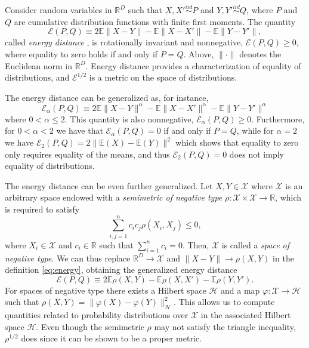 \documentclass[aps,preprint,nofootinbib,floatfix]{revtex4-1}
\newcommand\Energy{\mathcal{E}}
\newcommand\E{\mathbb{E}}
\begin{document}
Consider random variables in $\mathbb{R}^D$ 
such that $X,X' \stackrel{iid}{\sim} P$ and 
$Y,Y' \stackrel{iid}{\sim} Q$, where $P$ and $Q$ are cumulative
distribution functions with finite first moments. 
The quantity 
\begin{equation}
\label{eq:energy}
\Energy(P, Q) \equiv 2 \E \| X - Y\| - \E \| X - X' \| - \E \| Y - Y' \|,
\end{equation}
called \emph{energy distance} \cite{Szkely2013}, 
is rotationally invariant and nonnegative, $\Energy(P,Q) \ge 0$, where
equality
to zero holds if and only if $P = Q$.
Above, $\| \cdot \|$ denotes the
Euclidean norm in $\mathbb{R}^D$. 
Energy distance
provides a characterization of equality of distributions, and
$\Energy^{1/2}$ is
a metric on the space of distributions.

The energy distance can be generalized as, for instance,
\begin{equation}
\label{eq:energy2}
\Energy_\alpha(P, Q) \equiv 
2 \E \| X - Y\|^{\alpha} - \E \| X - X' \|^{\alpha} - 
\E \| Y - Y' \|^{\alpha}
\end{equation}
where $0<\alpha\le 2$. This quantity is also nonnegative,
$\Energy_\alpha(P,Q) \ge 0$. Furthermore, for $0<\alpha<2$ we have that
$\Energy_\alpha(P,Q) = 0$ if and only if $P=Q$, while for $\alpha=2$ 
we have $\Energy_2(P,Q) = 2\| \E(X) - \E(Y) \|^2$ which shows that
equality to zero only requires
equality of the means, and thus $\Energy_2(P,Q)=0$ does 
not imply equality of distributions.

The energy distance can be even further generalized.
Let $X, Y \in \mathcal{X}$  where $\mathcal{X}$ is an arbitrary space endowed
with a \emph{semimetric of negative type}
$\rho: \mathcal{X}\times\mathcal{X} \to \mathbb{R}$, which is required
to satisfy
\begin{equation}
\label{eq:negative_type}
\sum_{i,j=1}^n c_i c_j \rho(X_i, X_j) \le 0,
\end{equation}
where $X_i \in \mathcal{X}$ and $c_i \in \mathbb{R}$ such that
$\sum_{i=1}^n c_i = 0$. Then, $\mathcal{X}$ is called a \emph{space of
negative type}.
We can thus replace $\mathbb{R}^D \to \mathcal{X}$ and 
$\| X - Y \| \to \rho(X , Y)$ in the definition \eqref{eq:energy}, obtaining
the generalized energy distance
\begin{equation}
\label{eq:energy3}
\Energy(P, Q) \equiv 2 \E \rho(X,Y) - \E \rho(X, X') - \E \rho(Y,Y').
\end{equation}
For spaces of negative type there exists a Hilbert space $\mathcal{H}$ and
a map $\varphi: \mathcal{X} \to
\mathcal{H}$ such that
$\rho(X, Y) = \| \varphi(X) - \varphi(Y) \|_{\mathcal{H}}^2$. This
allows us to compute quantities related to probability distributions over
$\mathcal{X}$ in the associated Hilbert space $\mathcal{H}$.
Even though the semimetric 
$\rho$ may not satisfy the triangle inequality, 
$\rho^{1/2}$ does since it can be shown to be a proper metric. 
\end{document}
